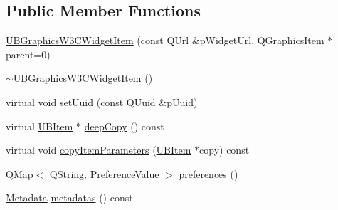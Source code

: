 \subsection*{Public Member Functions}
\begin{DoxyCompactItemize}
\item 
\hyperlink{class_u_b_graphics_w3_c_widget_item_ab2c66d142841ad2a1c0fa7cc0d068716}{U\-B\-Graphics\-W3\-C\-Widget\-Item} (const Q\-Url \&p\-Widget\-Url, Q\-Graphics\-Item $\ast$parent=0)
\item 
\hyperlink{class_u_b_graphics_w3_c_widget_item_a03e947e05b0493745934cc3fd4f8dd46}{$\sim$\-U\-B\-Graphics\-W3\-C\-Widget\-Item} ()
\item 
virtual void \hyperlink{class_u_b_graphics_w3_c_widget_item_ab094d8bf072b39d5c9bc8e9c82a07787}{set\-Uuid} (const Q\-Uuid \&p\-Uuid)
\item 
virtual \hyperlink{class_u_b_item}{U\-B\-Item} $\ast$ \hyperlink{class_u_b_graphics_w3_c_widget_item_acf920df1d2e797ea341429c76d75c3c7}{deep\-Copy} () const 
\item 
virtual void \hyperlink{class_u_b_graphics_w3_c_widget_item_ac66c8274e94b6818db04a60e712ac97c}{copy\-Item\-Parameters} (\hyperlink{class_u_b_item}{U\-B\-Item} $\ast$copy) const 
\item 
Q\-Map$<$ Q\-String, \hyperlink{class_u_b_graphics_w3_c_widget_item_1_1_preference_value}{Preference\-Value} $>$ \hyperlink{class_u_b_graphics_w3_c_widget_item_a31bef40ae61256f8e1e1896e91de3e13}{preferences} ()
\item 
\hyperlink{class_u_b_graphics_w3_c_widget_item_1_1_metadata}{Metadata} \hyperlink{class_u_b_graphics_w3_c_widget_item_a980ba9ab61504d20883ebb176fd5d5cc}{metadatas} () const 
\end{DoxyCompactItemize}
